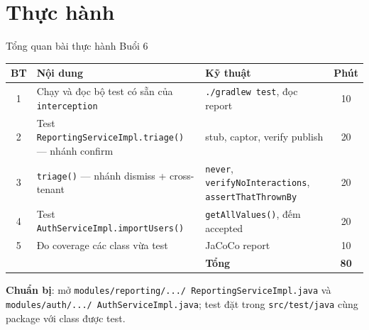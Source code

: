 \documentclass[aspectratio=169,12pt]{beamer}
\begin{document}
\section{Thực hành}

\begin{frame}{Tổng quan bài thực hành Buổi 6}
  \begin{center}
  \scriptsize
  \setlength{\tabcolsep}{3.5pt}
  \renewcommand{\arraystretch}{1.15}
  \begin{tabular}{c>{\raggedright\arraybackslash}p{5.2cm}>{\raggedright\arraybackslash}p{4.6cm}c}
    \toprule
    \textbf{BT} & \textbf{Nội dung} & \textbf{Kỹ thuật} & \textbf{Phút} \\
    \midrule
    1 & Chạy và đọc bộ test có sẵn của \texttt{interception} & \texttt{./gradlew test}, đọc report & 10 \\
    2 & Test \texttt{ReportingServiceImpl\allowbreak.triage()} --- nhánh confirm & stub, captor, verify publish & 20 \\
    3 & \texttt{triage()} --- nhánh dismiss + cross-tenant & \texttt{never}, \texttt{verifyNoInteractions}, \texttt{assertThatThrownBy} & 20 \\
    4 & Test \texttt{AuthServiceImpl\allowbreak.importUsers()} & \texttt{getAllValues()}, đếm accepted & 20 \\
    5 & Đo coverage các class vừa test & JaCoCo report & 10 \\
    \midrule
    & & \textbf{Tổng} & \textbf{80} \\
    \bottomrule
  \end{tabular}
  \end{center}

  \vspace{0.2em}
  {\small \textbf{Chuẩn bị}: mở \texttt{modules/reporting/.../\allowbreak
  ReportingServiceImpl.java} và \texttt{modules/auth/.../\allowbreak
  AuthServiceImpl.java}; test đặt trong \texttt{src/test/java} cùng package
  với class được test.}
\end{frame}
\end{document}
